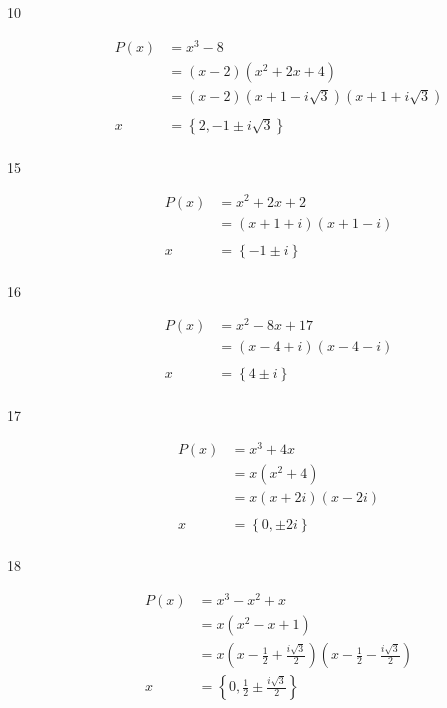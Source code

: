 \documentclass{exam}
\begin{document}
\begin{description}
      \item[10] 
        \begin{align*}
          P(x) &= x^3 - 8 \\
               &= (x - 2)(x^2 + 2x + 4) \\
               &= (x - 2)(x + 1 - i \sqrt{3})(x + 1 + i \sqrt{3}) \\
               \\
          x    &= \boxed{\left\{ 2, -1 \pm i \sqrt{3} \right\}} \\
        \end{align*}

      \item[15] 
        \begin{align*}
          P(x) &= x^2 + 2x + 2 \\
               &= (x + 1 + i)(x + 1 - i) \\
               \\
          x    &= \boxed{\left\{ -1 \pm i \right\}} \\
        \end{align*}

      \item[16] 
        \begin{align*}
          P(x) &= x^2 - 8x + 17 \\
               &= (x - 4 + i)(x - 4 - i) \\
               \\
          x    &= \boxed{\left\{ 4 \pm i \right\}} \\
        \end{align*}

      \item[17] 
        \begin{align*}
          P(x) &= x^3 + 4x \\
               &= x(x^2 + 4) \\
               &= x(x + 2i)(x - 2i) \\
               \\
          x    &= \boxed{\left\{ 0, \pm 2i \right\}} \\
        \end{align*}

      \item[18] 
        \begin{align*}
          P(x) &= x^3 - x^2 + x \\
               &= x(x^2 - x + 1) \\
               &= x(x - \frac{1}{2}+\frac{i \sqrt{3}}{2})(x - \frac{1}{2}-\frac{i \sqrt{3}}{2})
               \\
          x    &= \boxed{\left\{ 0, \frac{1}{2} \pm \frac{i \sqrt{3}}{2} \right\}} \\
        \end{align*}


\end{description}
\end{document}
